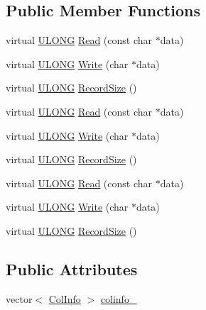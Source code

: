 \subsection*{Public Member Functions}
\begin{DoxyCompactItemize}
\item 
virtual \hyperlink{_basic_excel_8hpp_abe09d1bea023be6a07cbadde8e955435}{U\+L\+O\+N\+G} \hyperlink{struct_y_excel_1_1_worksheet_1_1_col_infos_a4b11a1d84d47e63a1080de887d43d97a}{Read} (const char $\ast$data)
\item 
virtual \hyperlink{_basic_excel_8hpp_abe09d1bea023be6a07cbadde8e955435}{U\+L\+O\+N\+G} \hyperlink{struct_y_excel_1_1_worksheet_1_1_col_infos_a22f0f4badf95a571f3bfc4adb4fdfd68}{Write} (char $\ast$data)
\item 
virtual \hyperlink{_basic_excel_8hpp_abe09d1bea023be6a07cbadde8e955435}{U\+L\+O\+N\+G} \hyperlink{struct_y_excel_1_1_worksheet_1_1_col_infos_aaedf64f2900f117fa2103dc9ac49869f}{Record\+Size} ()
\item 
virtual \hyperlink{_basic_excel_8hpp_abe09d1bea023be6a07cbadde8e955435}{U\+L\+O\+N\+G} \hyperlink{struct_y_excel_1_1_worksheet_1_1_col_infos_a12bfc5da8117b7922c0cb715e64cc9f9}{Read} (const char $\ast$data)
\item 
virtual \hyperlink{_basic_excel_8hpp_abe09d1bea023be6a07cbadde8e955435}{U\+L\+O\+N\+G} \hyperlink{struct_y_excel_1_1_worksheet_1_1_col_infos_a091f4f9477711b76ed77210e74057a9f}{Write} (char $\ast$data)
\item 
virtual \hyperlink{_basic_excel_8hpp_abe09d1bea023be6a07cbadde8e955435}{U\+L\+O\+N\+G} \hyperlink{struct_y_excel_1_1_worksheet_1_1_col_infos_a46b1913a3ab4292b58565cbc351843c4}{Record\+Size} ()
\item 
virtual \hyperlink{_basic_excel_8hpp_abe09d1bea023be6a07cbadde8e955435}{U\+L\+O\+N\+G} \hyperlink{struct_y_excel_1_1_worksheet_1_1_col_infos_a12bfc5da8117b7922c0cb715e64cc9f9}{Read} (const char $\ast$data)
\item 
virtual \hyperlink{_basic_excel_8hpp_abe09d1bea023be6a07cbadde8e955435}{U\+L\+O\+N\+G} \hyperlink{struct_y_excel_1_1_worksheet_1_1_col_infos_a091f4f9477711b76ed77210e74057a9f}{Write} (char $\ast$data)
\item 
virtual \hyperlink{_basic_excel_8hpp_abe09d1bea023be6a07cbadde8e955435}{U\+L\+O\+N\+G} \hyperlink{struct_y_excel_1_1_worksheet_1_1_col_infos_a46b1913a3ab4292b58565cbc351843c4}{Record\+Size} ()
\end{DoxyCompactItemize}
\subsection*{Public Attributes}
\begin{DoxyCompactItemize}
\item 
vector$<$ \hyperlink{struct_y_excel_1_1_worksheet_1_1_col_info}{Col\+Info} $>$ \hyperlink{struct_y_excel_1_1_worksheet_1_1_col_infos_a580165541f2d0bc5cdbcaa8489ab92ee}{colinfo\+\_\+}
\end{DoxyCompactItemize}


